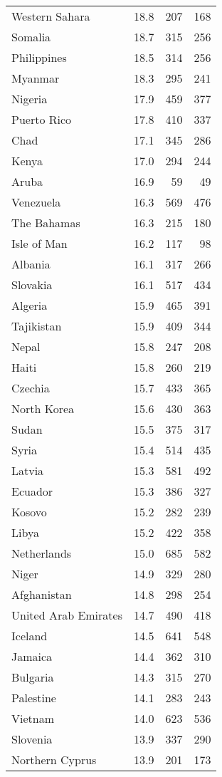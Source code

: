 \begin{table}[htbp]
\begin{tabular}{lrrr}
Western Sahara & 18.8 & 207 & 168 \\
Somalia & 18.7 & 315 & 256 \\
Philippines & 18.5 & 314 & 256 \\
Myanmar & 18.3 & 295 & 241 \\
Nigeria & 17.9 & 459 & 377 \\
Puerto Rico & 17.8 & 410 & 337 \\
Chad & 17.1 & 345 & 286 \\
Kenya & 17.0 & 294 & 244 \\
Aruba & 16.9 & 59 & 49 \\
Venezuela & 16.3 & 569 & 476 \\
The Bahamas & 16.3 & 215 & 180 \\
Isle of Man & 16.2 & 117 & 98 \\
Albania & 16.1 & 317 & 266 \\
Slovakia & 16.1 & 517 & 434 \\
Algeria & 15.9 & 465 & 391 \\
Tajikistan & 15.9 & 409 & 344 \\
Nepal & 15.8 & 247 & 208 \\
Haiti & 15.8 & 260 & 219 \\
Czechia & 15.7 & 433 & 365 \\
North Korea & 15.6 & 430 & 363 \\
Sudan & 15.5 & 375 & 317 \\
Syria & 15.4 & 514 & 435 \\
Latvia & 15.3 & 581 & 492 \\
Ecuador & 15.3 & 386 & 327 \\
Kosovo & 15.2 & 282 & 239 \\
Libya & 15.2 & 422 & 358 \\
Netherlands & 15.0 & 685 & 582 \\
Niger & 14.9 & 329 & 280 \\
Afghanistan & 14.8 & 298 & 254 \\
United Arab Emirates & 14.7 & 490 & 418 \\
Iceland & 14.5 & 641 & 548 \\
Jamaica & 14.4 & 362 & 310 \\
Bulgaria & 14.3 & 315 & 270 \\
Palestine & 14.1 & 283 & 243 \\
Vietnam & 14.0 & 623 & 536 \\
Slovenia & 13.9 & 337 & 290 \\
Northern Cyprus & 13.9 & 201 & 173 \\

\end{tabular}
\end{table}
